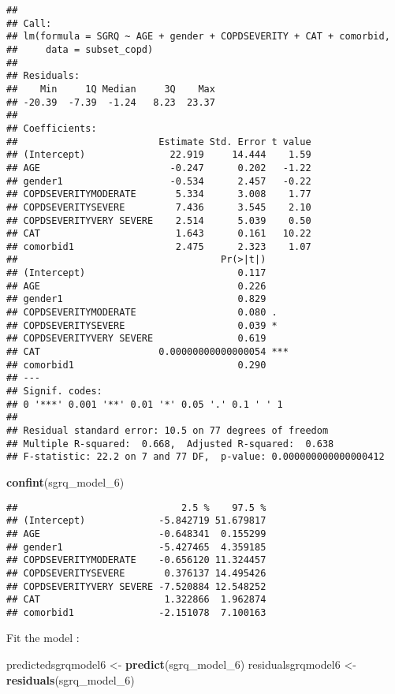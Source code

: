 \documentclass[
]{article}
\newenvironment{Shaded}{\begin{snugshade}}{\end{snugshade}}
\newcommand{\FunctionTok}[1]{\textcolor[rgb]{0.13,0.29,0.53}{\textbf{#1}}}
\newcommand{\NormalTok}[1]{#1}
\newcommand{\OtherTok}[1]{\textcolor[rgb]{0.56,0.35,0.01}{#1}}
\begin{document}
\begin{verbatim}
## 
## Call:
## lm(formula = SGRQ ~ AGE + gender + COPDSEVERITY + CAT + comorbid, 
##     data = subset_copd)
## 
## Residuals:
##    Min     1Q Median     3Q    Max 
## -20.39  -7.39  -1.24   8.23  23.37 
## 
## Coefficients:
##                         Estimate Std. Error t value
## (Intercept)               22.919     14.444    1.59
## AGE                       -0.247      0.202   -1.22
## gender1                   -0.534      2.457   -0.22
## COPDSEVERITYMODERATE       5.334      3.008    1.77
## COPDSEVERITYSEVERE         7.436      3.545    2.10
## COPDSEVERITYVERY SEVERE    2.514      5.039    0.50
## CAT                        1.643      0.161   10.22
## comorbid1                  2.475      2.323    1.07
##                                    Pr(>|t|)    
## (Intercept)                           0.117    
## AGE                                   0.226    
## gender1                               0.829    
## COPDSEVERITYMODERATE                  0.080 .  
## COPDSEVERITYSEVERE                    0.039 *  
## COPDSEVERITYVERY SEVERE               0.619    
## CAT                     0.00000000000000054 ***
## comorbid1                             0.290    
## ---
## Signif. codes:  
## 0 '***' 0.001 '**' 0.01 '*' 0.05 '.' 0.1 ' ' 1
## 
## Residual standard error: 10.5 on 77 degrees of freedom
## Multiple R-squared:  0.668,  Adjusted R-squared:  0.638 
## F-statistic: 22.2 on 7 and 77 DF,  p-value: 0.000000000000000412
\end{verbatim}

\begin{Shaded}
\begin{Highlighting}[]
\FunctionTok{confint}\NormalTok{(sgrq\_model\_6)}
\end{Highlighting}
\end{Shaded}

\begin{verbatim}
##                             2.5 %    97.5 %
## (Intercept)             -5.842719 51.679817
## AGE                     -0.648341  0.155299
## gender1                 -5.427465  4.359185
## COPDSEVERITYMODERATE    -0.656120 11.324457
## COPDSEVERITYSEVERE       0.376137 14.495426
## COPDSEVERITYVERY SEVERE -7.520884 12.548252
## CAT                      1.322866  1.962874
## comorbid1               -2.151078  7.100163
\end{verbatim}

Fit the model :

\begin{Shaded}
\begin{Highlighting}[]
\NormalTok{predictedsgrqmodel6 }\OtherTok{\textless{}{-}} \FunctionTok{predict}\NormalTok{(sgrq\_model\_6)}
\NormalTok{residualsgrqmodel6 }\OtherTok{\textless{}{-}} \FunctionTok{residuals}\NormalTok{(sgrq\_model\_6)}
\end{Highlighting}
\end{Shaded}
\end{document}
